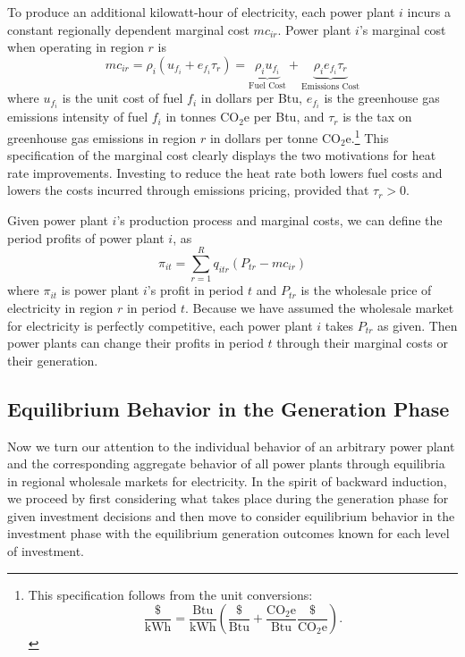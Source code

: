 To produce an additional kilowatt-hour of electricity, each power plant $i$ incurs a constant regionally dependent marginal cost $mc_{ir}$. Power plant $i$'s marginal cost when operating in region $r$ is
\begin{equation}
    mc_{ir} = \rho_i(u_{f_i} + e_{f_i} \tau_r) = \underbrace{\rho_i u_{f_i}}_{\text{Fuel Cost}} + \underbrace{\rho_i e_{f_i} \tau_r}_{\text{Emissions Cost}}
\end{equation}
where $u_{f_i}$ is the unit cost of fuel $f_i$ in dollars per Btu, $e_{f_i}$ is the greenhouse gas emissions intensity of fuel $f_i$ in tonnes CO$_2$e per Btu, and $\tau_r$ is the tax on greenhouse gas emissions in region $r$ in dollars per tonne CO$_2$e.\footnote{This specification follows from the unit conversions:
    $$\frac{\$}{\text{kWh}} = \frac{\text{Btu}}{\text{kWh}}\left( \frac{\$}{\text{Btu}} + \frac{\text{CO}_2\text{e}}{\text{Btu}} \frac{\$}{\text{CO}_2\text{e}}\right).$$
}
This specification of the marginal cost clearly displays the two motivations for heat rate improvements. Investing to reduce the heat rate both lowers fuel costs and lowers the costs incurred through emissions pricing, provided that $\tau_r > 0$. 

Given power plant $i$'s production process and marginal costs, we can define the period profits of power plant $i$, as
\begin{equation}\label{per_pi}
    \pi_{it} = \sum_{r = 1}^R q_{itr} (P_{tr} - mc_{ir})
\end{equation}
where $\pi_{it}$ is power plant $i$'s profit in period $t$ and $P_{tr}$ is the wholesale price of electricity in region $r$ in period $t$. Because we have assumed the wholesale market for electricity is perfectly competitive, each power plant $i$ takes $P_{tr}$ as given. Then power plants can change their profits in period $t$ through their marginal costs or their generation.


\subsection{Equilibrium Behavior in the Generation Phase}

Now we turn our attention to the individual behavior of an arbitrary power plant and the corresponding aggregate behavior of all power plants through equilibria in regional wholesale markets for electricity. In the spirit of backward induction, we proceed by first considering what takes place during the generation phase for given investment decisions and then move to consider equilibrium behavior in the investment phase with the equilibrium generation outcomes known for each level of investment.

